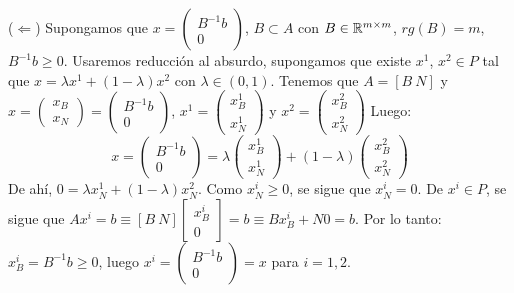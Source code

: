\documentclass[PM.tex]{subfiles}
\begin{document}
\begin{dem}
($\Leftarrow$) Supongamos que $x =\begin{pmatrix} B^{-1}b\\0\end{pmatrix}$, $B \subset A$ con $B \in \mathbb{R}^{m \times m}$, $rg(B)=m$, $B^{-1}b ≥ 0$. Usaremos reducción al absurdo, supongamos que existe $x^1$, $x^2 \in P$ tal que $x = λx^1+(1-λ)x^2$ con $λ \in (0,1)$. Tenemos que $A = [B\ N]$ y $x = \begin{pmatrix}x_B\\x_N\end{pmatrix} = \begin{pmatrix} B^{-1}b\\0\end{pmatrix}$, $x^1 = \begin{pmatrix}x_B^1\\x_N^1\end{pmatrix}$ y $x^2 = \begin{pmatrix}x_B^2\\x_N^2\end{pmatrix}$ Luego:
\[ x = \begin{pmatrix} B^{-1}b\\0\end{pmatrix} = λ\begin{pmatrix}x_B^1\\x_N^1\end{pmatrix}+(1-λ)\begin{pmatrix}x_B^2\\x_N^2\end{pmatrix} \]
De ahí, $0 = λ x_N^1 + (1-λ) x_N^2$. Como $x_N^i ≥ 0$, se sigue que $x_N^i = 0$. De $x^i \in P$, se sigue que $Ax^i = b \equiv [B\ N]\begin{bmatrix}x_B^i\\0
\end{bmatrix} = b \equiv Bx_B^i + N0 = b$. Por lo tanto: $x_B^i = B^{-1}b \geq 0$, luego $x^i = \begin{pmatrix}B^{-1}b\\0\end{pmatrix}=x$ para $i=1,2$.


\end{dem}
\end{document}
